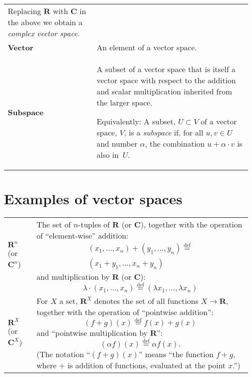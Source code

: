 \documentclass[10pt, a4paper, landscape]{article}
\newcommand{\defn}[1]{\textbf{#1}}
\newcommand{\isdef}{\stackrel{\text{def}}{=}}
\newcommand{\set}[1]{\mathbold{#1}}
\begin{document}
\begin{multicols*}{3}
\begin{tabularx}{\columnwidth}{@{}l>{\raggedright\arraybackslash}X@{}}
  Replacing $\set{R}$ with $\set{C}$ in the above we obtain a
  \emph{complex vector space}. \\

  \defn{Vector} & An element of a vector space. \\

  \defn{Subspace} & A subset of a vector space that is itself a vector
  space with respect to the addition and scalar multiplication inherited
  from the larger space.

  Equivalently: A subset, $U \subset V$ of a vector space, $V$, is a \emph{subspace} if, for all $u, v\in U$ and number $\alpha$, the combination $u+\alpha \cdot v$ is also in~$U$.
\end{tabularx}

\section*{Examples of vector spaces}
\begin{tabularx}{\columnwidth}{@{}l>{\raggedright\arraybackslash}X@{}}
  \toprule
  $\set{R}^n$ (or $\set{C}^n$) & The set of $n$-tuples of $\set{R}$ (or $\set{C}$), together with the operation of “element-wise” addition:
  \begin{multline*}
    (x_1, \dotsc, x_n) + (y_1, \dotsc, y_n) \isdef \\ (x_1+y_1, \dotsc, x_n+y_n) 
  \end{multline*}
  and multiplication by $\set{R}$ (or $\set{C}$):
  \begin{equation*}
    \lambda \cdot (x_1, \dotsc, x_n) \isdef (\lambda x_1, \dotsc, \lambda x_n) 
  \end{equation*} \\

  $\set{R}^X$ (or $\set{C}^X$) & For $X$ a set, $\set{R}^X$ denotes the set of all functions $X\to\mathbold{R}$, together with the operation of “pointwise addition”:
  \begin{equation*}
    (f+g)(x) \isdef f(x) + g(x)
  \end{equation*}
  and “pointwise multiplication by $\mathbold{R}$”:
  \begin{equation*}
    (\alpha f)(x) \isdef \alpha f(x).
  \end{equation*}
  (The notation “$(f+g)(x)$” means “the function $f+g$, where $+$ is addition of functions, evaluated at the point $x$.”)
    \end{tabularx}



\end{multicols*}
\end{document}
